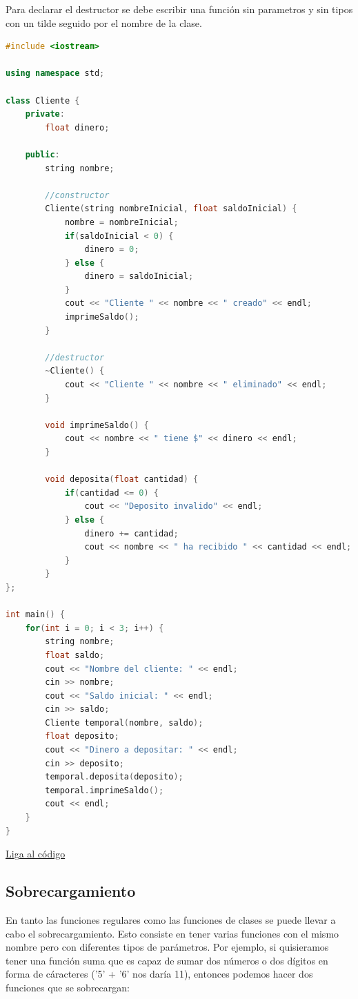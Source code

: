 \documentclass{article}
\begin{document}
Para declarar el destructor se debe escribir una función sin parametros y sin tipos con un tilde seguido por el nombre de la clase.

\begin{lstlisting}[language=C++, caption=Destructores]
#include <iostream>

using namespace std;

class Cliente {
    private:
        float dinero;

    public:
        string nombre;

        //constructor
        Cliente(string nombreInicial, float saldoInicial) {
            nombre = nombreInicial;
            if(saldoInicial < 0) {
                dinero = 0;
            } else {
                dinero = saldoInicial;
            }
            cout << "Cliente " << nombre << " creado" << endl;
            imprimeSaldo();
        }

        //destructor
        ~Cliente() {
            cout << "Cliente " << nombre << " eliminado" << endl;
        }

        void imprimeSaldo() {
            cout << nombre << " tiene $" << dinero << endl;
        }

        void deposita(float cantidad) {
            if(cantidad <= 0) {
                cout << "Deposito invalido" << endl;
            } else {
                dinero += cantidad;
                cout << nombre << " ha recibido " << cantidad << endl;
            }
        }
};

int main() {
    for(int i = 0; i < 3; i++) {
        string nombre;
        float saldo;
        cout << "Nombre del cliente: " << endl;
        cin >> nombre;
        cout << "Saldo inicial: " << endl;
        cin >> saldo;
        Cliente temporal(nombre, saldo);
        float deposito;
        cout << "Dinero a depositar: " << endl;
        cin >> deposito;
        temporal.deposita(deposito);
        temporal.imprimeSaldo();
        cout << endl;
    }
}
\end{lstlisting}
\href{https://repl.it/@Jamesscn/Clases}{Liga al código} \\

\subsection{Sobrecargamiento}

En tanto las funciones regulares como las funciones de clases se puede llevar a cabo el sobrecargamiento. Esto consiste en tener varias funciones con el mismo nombre pero con diferentes tipos de parámetros. Por ejemplo, si quisieramos tener una función suma que es capaz de sumar dos números o dos dígitos en forma de cáracteres ('5' + '6' nos daría 11), entonces podemos hacer dos funciones que se sobrecargan:
\end{document}
